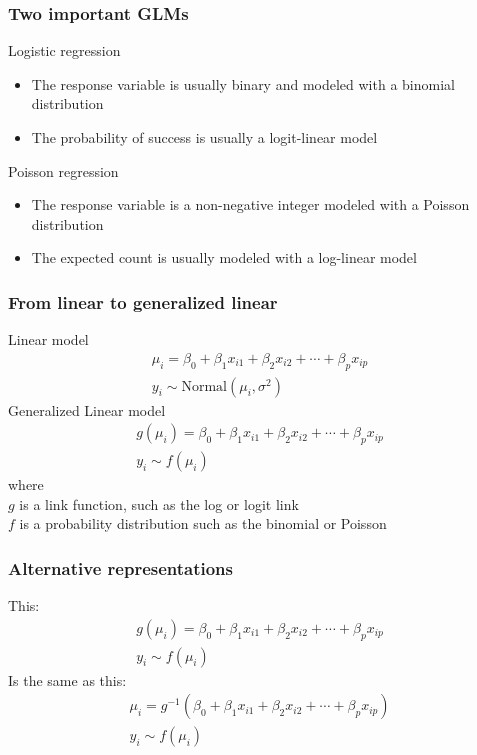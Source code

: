 \documentclass[color=usenames,dvipsnames]{beamer}\usepackage[]{graphicx}\usepackage[]{color}
\begin{document}
\begin{frame}
  \frametitle{Two important GLMs}
  {Logistic regression \\}
  \begin{itemize}
    \item The response variable is usually binary and modeled with a
      binomial distribution
    \item The probability of success is usually a logit-linear
      model
  \end{itemize}
  \pause
  \vfill
  {Poisson regression \\}
  \begin{itemize}
    \item The response variable is a non-negative integer modeled with
      a Poisson distribution
    \item The expected count is usually modeled with a log-linear
      model
  \end{itemize}
  \vfill
\end{frame}



\begin{frame}
  \frametitle{From linear to generalized linear}
  {Linear model}
  \begin{gather*}
    \mu_i = \beta_0 + \beta_1 x_{i1} + \beta_2 x_{i2} + \cdots + \beta_p x_{ip} \\
    y_i \sim \mathrm{Normal}(\mu_i, \sigma^2)
  \end{gather*}
  \pause
  \vfill
  {Generalized Linear model}
  \begin{gather*}
    g(\mu_i) = \beta_0 + \beta_1 x_{i1} + \beta_2 x_{i2} + \cdots + \beta_p x_{ip} \\
    y_i \sim f(\mu_i)
  \end{gather*}
  \pause
  {where} \\
  $g$ is a link function, such as the log or logit link \\
  \pause
  $f$ is a probability distribution such as the binomial or Poisson
\end{frame}


\begin{frame}
  \frametitle{Alternative representations}
  {This:}
  \begin{gather*}
    g(\mu_i) = \beta_0 + \beta_1 x_{i1} + \beta_2 x_{i2} + \cdots + \beta_p x_{ip} \\
    y_i \sim f(\mu_i)
  \end{gather*}
  \pause
  {Is the same as this:}
  \begin{gather*}
    \mu_i = g^{-1}(\beta_0 + \beta_1 x_{i1} + \beta_2 x_{i2} + \cdots + \beta_p x_{ip}) \\
    y_i \sim f(\mu_i)
  \end{gather*}
\end{frame}
\end{document}
